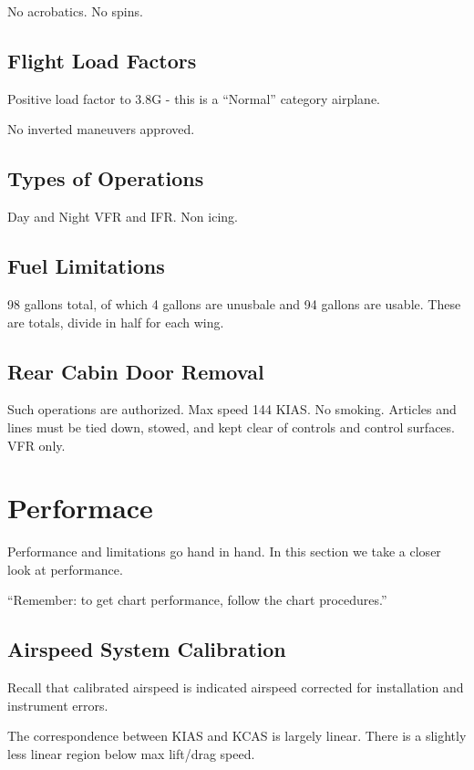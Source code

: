 No acrobatics. No spins.

\subsection{Flight Load Factors}

Positive load factor to 3.8G - this is a ``Normal'' category airplane.

No inverted maneuvers approved.

\subsection{Types of Operations}

Day and Night VFR and IFR. Non icing.

\subsection{Fuel Limitations}

98 gallons total, of which 4 gallons are unusbale and 94 gallons are usable. These are totals, divide in half for each wing.

\subsection{Rear Cabin Door Removal}

Such operations are authorized. Max speed 144 KIAS. No smoking. Articles and lines must be tied down, stowed, and kept clear of controls and control surfaces. VFR only.


\section{Performace}

Performance and limitations go hand in hand. In this section we take a closer look at performance.

``Remember: to get chart performance, follow the chart procedures.''

\subsection{Airspeed System Calibration}

Recall that calibrated airspeed is indicated airspeed corrected for installation and instrument errors.

The correspondence between KIAS and KCAS is largely linear. There is a slightly less linear region below max lift/drag speed.

